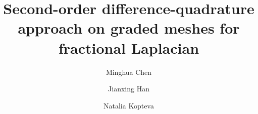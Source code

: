 \documentclass{amsart}
\theoremstyle{definition}
\theoremstyle{remark}
\numberwithin{equation}{section}
\begin{document}
\title{Second-order  difference-quadrature approach    on graded meshes  for fractional Laplacian }


\author{Minghua Chen}
\address{School of Mathematics and Statistics, Gansu Key Laboratory of Applied Mathematics and Complex Systems, Lanzhou University, Lanzhou 730000, P.R. China }


\author{Jianxing Han}
\address{School of Mathematics and Statistics, Gansu Key Laboratory of Applied Mathematics and Complex Systems, Lanzhou University, Lanzhou 730000, P.R. China}


\author{Natalia Kopteva}
\address{Department of Mathematics and Statistics
University of Limerick
Limerick, V94 T9PX, Ireland}
  






%
\end{document}
